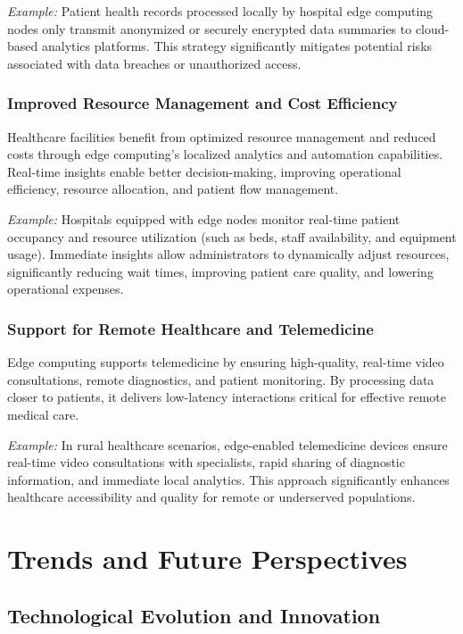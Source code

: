 \documentclass[runningheads]{llncs}
\begin{document}
\noindent\textit{Example:} Patient health records processed locally by hospital edge computing nodes only transmit anonymized or securely encrypted data summaries to cloud-based analytics platforms. This strategy significantly mitigates potential risks associated with data breaches or unauthorized access.

\subsubsection{Improved Resource Management and Cost Efficiency}
Healthcare facilities benefit from optimized resource management and reduced costs through edge computing’s localized analytics and automation capabilities. Real-time insights enable better decision-making, improving operational efficiency, resource allocation, and patient flow management.

\noindent\textit{Example:} Hospitals equipped with edge nodes monitor real-time patient occupancy and resource utilization (such as beds, staff availability, and equipment usage). Immediate insights allow administrators to dynamically adjust resources, significantly reducing wait times, improving patient care quality, and lowering operational expenses.

\subsubsection{Support for Remote Healthcare and Telemedicine}
Edge computing supports telemedicine by ensuring high-quality, real-time video consultations, remote diagnostics, and patient monitoring. By processing data closer to patients, it delivers low-latency interactions critical for effective remote medical care.

\noindent\textit{Example:} In rural healthcare scenarios, edge-enabled telemedicine devices ensure real-time video consultations with specialists, rapid sharing of diagnostic information, and immediate local analytics. This approach significantly enhances healthcare accessibility and quality for remote or underserved populations.


\section{Trends and Future Perspectives}

\subsection{Technological Evolution and Innovation}
\end{document}
